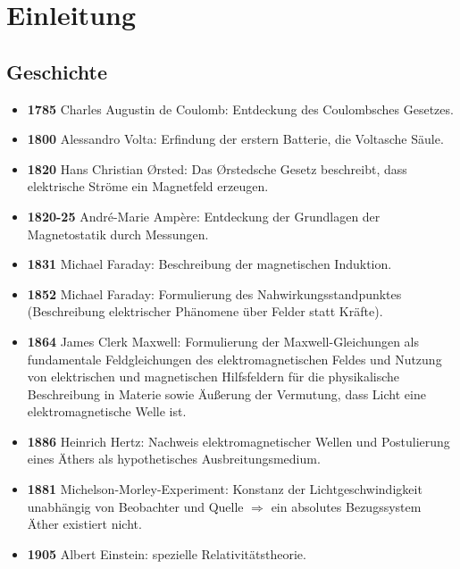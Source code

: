 
\chapter{Einleitung\label{einleitung}}

\section{Geschichte}

\begin{itemize}
    \item \textbf{1785} \textendash{} Charles Augustin de Coulomb: Entdeckung des Coulombsches Gesetzes.
    
    \item \textbf{1800} \textendash{} Alessandro Volta: Erfindung der erstern Batterie, die Voltasche Säule. 
    
    \item \textbf{1820} \textendash{}  Hans Christian \O{}rsted: Das \O{}rstedsche Gesetz beschreibt, dass elektrische Ströme ein Magnetfeld erzeugen. 
    
    \item \textbf{1820-25} \textendash{}   André-Marie Ampère: Entdeckung der Grundlagen der Magnetostatik durch Messungen.
    
    \item \textbf{1831} \textendash{}  Michael Faraday: Beschreibung der magnetischen Induktion.
    
    \item \textbf{1852} \textendash{}  Michael Faraday: Formulierung des Nahwirkungsstandpunktes (Beschreibung elektrischer Phänomene über Felder statt Kräfte). 
    
    \item \textbf{1864} \textendash{} James Clerk Maxwell: Formulierung der Maxwell-Gleichungen als fundamentale Feldgleichungen des elektromagnetischen Feldes und Nutzung von elektrischen und magnetischen Hilfsfeldern für die physikalische Beschreibung in Materie sowie Äußerung der Vermutung, dass Licht eine elektromagnetische Welle ist. 
    
    \item \textbf{1886} \textendash{} Heinrich Hertz: Nachweis elektromagnetischer Wellen und Postulierung eines Äthers als hypothetisches Ausbreitungsmedium. 
    
    \item \textbf{1881} \textendash{} Michelson-Morley-Experiment: Konstanz der Lichtgeschwindigkeit unabhängig von Beobachter und Quelle ${\Rightarrow}$ ein absolutes Bezugssystem Äther existiert nicht.
    
    \item \textbf{1905} \textendash{} Albert Einstein: spezielle Relativitätstheorie.

\end{itemize}





